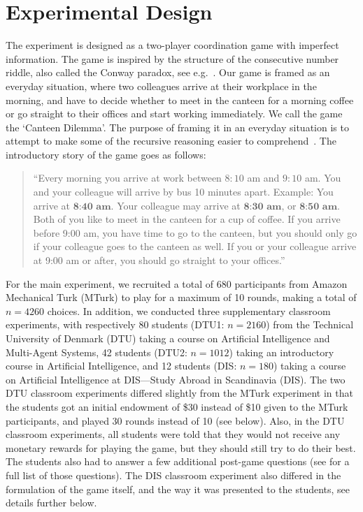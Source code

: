 \section{Experimental Design}\label{sect:experimental_design} 
The experiment is designed as a two-player coordination game with imperfect information. The game is inspired by the structure of the consecutive number riddle, also called the Conway paradox, see e.g.\ \cite{van1980conway,van2015one}. Our game is framed as an everyday situation, where two colleagues arrive at their workplace in the morning, and have to decide whether to meet in the canteen for a morning coffee or go straight to their offices and start working immediately. We call the game the `Canteen Dilemma'. The purpose of framing it in an everyday situation is to attempt to make some of the recursive reasoning easier to comprehend~\cite{meijering2010facilitative, wason1971natural}. The introductory story of the game goes as follows:
\begin{quote}
\indent
``Every morning you arrive at work between $8{:}10$ am and $9{:}10$ am. You and your colleague will arrive by bus 10 minutes apart. Example: You arrive at $\textbf{8:40 am}$. Your colleague may arrive at $\textbf{8:30  am}$, or $\textbf{8:50 am}$. Both of you like to meet in the canteen for a cup of coffee. If you arrive before 9:00 am, you have time to go to the canteen, but you should only go if your colleague goes to the canteen as well. If you or your colleague arrive at 9:00 am or after, you should go straight to your offices.''
\end{quote}
For the main experiment, we recruited a total of 680 participants from Amazon Mechanical Turk (MTurk) to play for a maximum of 10 rounds, making a total of $n=4260$ choices. In addition, we conducted three supplementary classroom experiments, with  respectively 80 students (DTU1: $n=2160$) from the Technical University of Denmark (DTU) taking a course on Artificial Intelligence and Multi-Agent Systems, 42 students (DTU2: $n=1012$) taking an introductory course in Artificial Intelligence, and 12 students (DIS: $n=180$) taking a course on Artificial Intelligence at DIS---Study Abroad in Scandinavia (DIS). The two DTU classroom experiments differed slightly from the MTurk experiment in that the students got an initial endowment of \$30 instead of \$10 given to the MTurk participants, and played 30 rounds instead of 10 (see below). Also, in the DTU classroom experiments, all students were told that they would not receive any monetary rewards for playing the game, but they should still try to do their best. The students also had to answer a few additional post-game questions (see   for a full list of those questions). The DIS classroom experiment also differed in the formulation of the game itself, and the way it was presented to the students, see details further below. 

